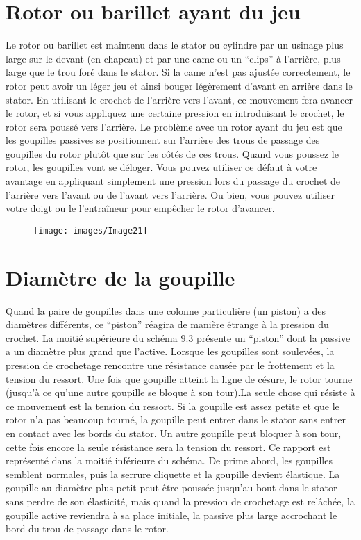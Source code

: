 \documentclass[a4paper,french,11pt,twoside]{report}
\begin{document}
\section{Rotor ou barillet ayant du jeu}

Le rotor ou barillet est maintenu dans le stator ou cylindre par un usinage plus large sur le devant (en chapeau) et par une came ou un \enquote{clips} à l'arrière, plus large que le trou foré dans le stator. Si la came n'est pas ajustée correctement, le rotor peut avoir un léger jeu et ainsi bouger légèrement d'avant en arrière dans le stator. En utilisant le crochet de l'arrière vers l'avant, ce mouvement fera avancer le rotor, et si vous appliquez une certaine pression en introduisant le crochet, le rotor sera poussé vers l'arrière. Le problème avec un rotor ayant du jeu est que les goupilles passives se positionnent sur l'arrière des trous de passage des goupilles du rotor plutôt que sur les côtés de ces trous. Quand vous poussez le rotor, les goupilles vont se déloger. Vous pouvez utiliser ce défaut à votre avantage en appliquant simplement une pression lors du passage du crochet de l'arrière vers l'avant ou de l'avant vers l'arrière. Ou bien, vous pouvez utiliser votre doigt ou le l'entraîneur pour empêcher le rotor d'avancer.

\begin{figure}[ht] \begin{center}
        \texttt{[image: images/Image21]}
        \caption{}
\end{center} \end{figure}

\section{Diamètre de la goupille}

Quand la paire de goupilles dans une colonne particulière (un piston) a des diamètres différents, ce \enquote{piston} réagira de manière étrange à la pression du crochet. La moitié supérieure du schéma 9.3 présente un \enquote{piston} dont la passive a un diamètre plus grand que l'active. Lorsque les goupilles sont soulevées, la pression de crochetage rencontre une résistance causée par le frottement et la tension du ressort. Une fois que goupille atteint la ligne de césure, le rotor tourne (jusqu'à ce qu'une autre goupille se bloque à son tour).La seule chose qui résiste à ce mouvement est la tension du ressort. Si la goupille est assez petite et que le rotor n'a pas beaucoup tourné, la goupille peut entrer dans le stator sans entrer en contact avec les bords du stator. Un autre goupille peut bloquer à son tour, cette fois encore la seule résistance sera la tension du ressort. Ce rapport est représenté dans la moitié inférieure du schéma. De prime abord, les goupilles semblent normales, puis la serrure cliquette et la goupille devient élastique. La goupille au diamètre plus petit peut être poussée jusqu'au bout dans le stator sans perdre de son élasticité, mais quand la pression de crochetage est relâchée, la goupille active reviendra à sa place initiale, la passive plus large accrochant le bord du trou de passage dans le rotor.
\end{document}

